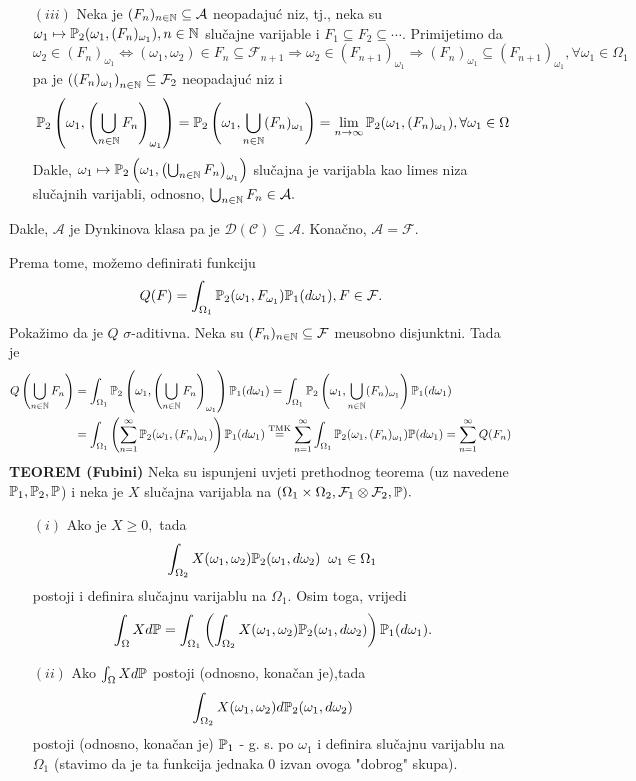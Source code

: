 \documentclass{article}
\begin{document}
{\begin{itemize}
    \item[\((iii)\)] Neka je \((F_n)_{n\in\Bbb N}\subseteq\mathcal A\) neopadajuć niz,  tj., neka su \(\omega_1\mapsto\Bbb P_2(\omega_1,(F_n)_{\omega_1}),n\in\Bbb N\) slučajne varijable i \(F_1\subseteq F_2\subseteq\cdots.\) Primijetimo da \[\omega_2\in (F_n)_{\omega_1}\Leftrightarrow (\omega_1,\omega_2)\in F_n\subseteq\mathcal F_{n+1}\Rightarrow\omega_2\in(F_{n+1})_{\omega_1}\Rightarrow (F_n)_{\omega_1}\subseteq(F_{n+1})_{\omega_1},\forall\omega_1\in\Omega_1\] pa je \(\left((F_n)_{\omega_1}\right)_{n\in\Bbb N}\subseteq\mathcal F_2\) neopadajuć niz i \[\Bbb P_2\left(\omega_1,\left(\bigcup_{n\in\Bbb N}F_n\right)_{\omega_1}\right)=\Bbb P_2\left(\omega_1,\bigcup_{n\in\Bbb N}(F_n)_{\omega_1}\right)=\lim_{n\to\infty}\Bbb P_2(\omega_1,(F_n)_{\omega_1}),\forall\omega_1\in\Omega\] Dakle, \(\omega_1\mapsto\Bbb P_2\left(\omega_1,\left(\bigcup_{n\in\Bbb N}F_n\right)_{\omega_1}\right)\) slučajna je varijabla kao limes niza slučajnih varijabli, odnosno, \(\bigcup_{n\in\Bbb N}F_n\in\mathcal A.\) 
\end{itemize} Dakle, \(\mathcal A\) je Dynkinova klasa pa je \(\mathscr D(\mathcal C)\subseteq\mathcal A.\) Konačno, \(\mathcal A=\mathcal F.\)}\newline Prema tome, možemo definirati funkciju \[Q(F)=\int_{\Omega_1}\Bbb P_2(\omega_1,F_{\omega_1})\Bbb P_1(d\omega_1), F\in\mathcal F.\]  Pokažimo da je \(Q\) \(\sigma\)-aditivna. Neka su \((F_n)_{n\in\Bbb N}\subseteq\mathcal F\) me\dj{}usobno disjunktni. Tada je \[\begin{aligned}Q\left(\bigcup_{n\in\Bbb N}F_n\right)&=\int_{\Omega_1}\Bbb P_2\left(\omega_1,\left(\bigcup_{n\in\Bbb N}F_n\right)_{\omega_1}\right)\Bbb P_1(d\omega_1)=\int_{\Omega_1}\Bbb P_2\left(\omega_1,\bigcup_{n\in\Bbb N}(F_n)_{\omega_1}\right)\Bbb P_1(d\omega_1)\\&=\int_{\Omega_1}\left(\sum_{n=1}^\infty\Bbb P_2(\omega_1,(F_n)_{\omega_1})\right)\Bbb P_1(d\omega_1)\overset{\text{TMK}}{=}\sum_{n=1}^\infty\int_{\Omega_1}\Bbb P_2(\omega_1,(F_n)_{\omega_1})\Bbb P(d\omega_1)=\sum_{n=1}^\infty Q(F_n)\end{aligned}\]
\textbf{TEOREM (Fubini)}\newline
Neka su ispunjeni uvjeti prethodnog teorema (uz navedene \(\Bbb P_1,\Bbb P_2,\Bbb P\)) i neka je \(X\) slučajna varijabla na \((\Omega_1\times\Omega_2,\mathcal F_1\otimes\mathcal F_2,\Bbb P).\)
\begin{enumerate}
    \item[\((i)\)] Ako je \(X\ge0,\) tada \[\int_{\Omega_2}X(\omega_1,\omega_2)\Bbb P_2(\omega_1,d\omega_2)\;\;\omega_1\in\Omega_1\] postoji i definira slučajnu varijablu na \(\Omega_1.\) Osim toga, vrijedi \[\int_\Omega Xd\Bbb P=\int_{\Omega_1}\left(\int_{\Omega_2}X(\omega_1,\omega_2)\Bbb P_2(\omega_1,d\omega_2)\right)\Bbb P_1(d\omega_1).\] 
    \item[\((ii)\)] Ako \(\int_\Omega Xd\Bbb P\) postoji (odnosno, konačan je),tada \[\int_{\Omega_2}X(\omega_1,\omega_2)d\Bbb P_2(\omega_1,d\omega_2)\] postoji (odnosno, konačan je) \(\Bbb P_1\) - g. s. po \(\omega_1\) i definira slučajnu varijablu na \(\Omega_1\) (stavimo da je ta funkcija jednaka \(0\) izvan ovoga "dobrog" skupa).
\end{enumerate}
\end{document}
